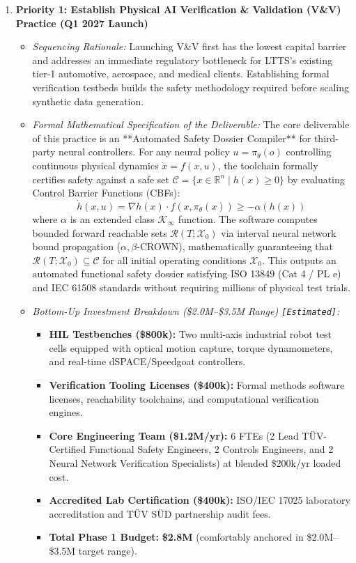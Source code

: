 \documentclass[11pt,a4paper]{article}
\begin{document}
\begin{enumerate}
    \item \textbf{Priority 1: Establish Physical AI Verification \& Validation (V\&V) Practice (Q1 2027 Launch)}
    \begin{itemize}
        \item \textit{Sequencing Rationale:} Launching V\&V first has the lowest capital barrier and addresses an immediate regulatory bottleneck for LTTS's existing tier-1 automotive, aerospace, and medical clients. Establishing formal verification testbeds builds the safety methodology required before scaling synthetic data generation.
        \item \textit{Formal Mathematical Specification of the Deliverable:}
        The core deliverable of this practice is an **Automated Safety Dossier Compiler** for third-party neural controllers. For any neural policy $u = \pi_\theta(o)$ controlling continuous physical dynamics $\dot{x} = f(x, u)$, the toolchain formally certifies safety against a safe set $\mathcal{C} = \{x \in \mathbb{R}^n \mid h(x) \ge 0\}$ by evaluating Control Barrier Functions (CBFs):
        \[
        \dot{h}(x, u) = \nabla h(x) \cdot f(x, \pi_\theta(x)) \ge -\alpha(h(x))
        \]
        where $\alpha$ is an extended class $\mathcal{K}_{\infty}$ function. The software computes bounded forward reachable sets $\mathcal{R}(T; \mathcal{X}_0)$ via interval neural network bound propagation ($\alpha,\beta$-CROWN), mathematically guaranteeing that $\mathcal{R}(T; \mathcal{X}_0) \subseteq \mathcal{C}$ for all initial operating conditions $\mathcal{X}_0$. This outputs an automated functional safety dossier satisfying ISO 13849 (Cat 4 / PL e) and IEC 61508 standards without requiring millions of physical test trials.
        \item \textit{Bottom-Up Investment Breakdown (\$2.0M--\$3.5M Range) \texttt{[Estimated]}:}
        \begin{itemize}
            \item \textbf{HIL Testbenches (\$800k):} Two multi-axis industrial robot test cells equipped with optical motion capture, torque dynamometers, and real-time dSPACE/Speedgoat controllers.
            \item \textbf{Verification Tooling Licenses (\$400k):} Formal methods software licenses, reachability toolchains, and computational verification engines.
            \item \textbf{Core Engineering Team (\$1.2M/yr):} 6 FTEs (2 Lead TÜV-Certified Functional Safety Engineers, 2 Controls Engineers, and 2 Neural Network Verification Specialists) at blended \$200k/yr loaded cost.
            \item \textbf{Accredited Lab Certification (\$400k):} ISO/IEC 17025 laboratory accreditation and TÜV SÜD partnership audit fees.
            \item \textbf{Total Phase 1 Budget:} \textbf{\$2.8M} (comfortably anchored in \$2.0M--\$3.5M target range).
        \end{itemize}
    \end{itemize}


\end{enumerate}
\end{document}
